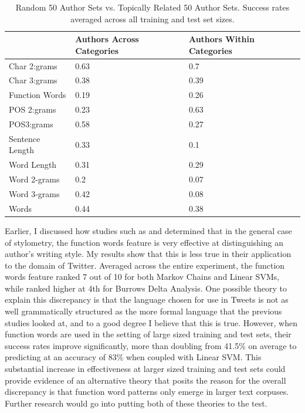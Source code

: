 \documentclass[pageno]{jpaper}
\begin{document}
\begin{table}[h!]
\centering
\begin{tabular}{|l|l|l|}
\hline
                & Authors Across Categories & Authors Within Categories \\ \hline
Char 2:grams    & 0.63                      & 0.7                       \\ \hline
Char 3:grams    & 0.38                      & 0.39                      \\ \hline
Function Words  & 0.19                      & 0.26                      \\ \hline
POS 2:grams     & 0.23                      & 0.63                      \\ \hline
POS3:grams      & 0.58                      & 0.27                      \\ \hline
Sentence Length & 0.33                      & 0.1                       \\ \hline
Word Length     & 0.31                      & 0.29                      \\ \hline
Word 2-grams    & 0.2                       & 0.07                      \\ \hline
Word 3-grams    & 0.42                      & 0.08                      \\ \hline
Words           & 0.44                      & 0.38                      \\ \hline
\end{tabular}
\caption{Random 50 Author Sets vs. Topically Related 50 Author Sets.  Success rates averaged across all training and test set sizes.}
\label{table:randAuthorSets}
\end{table}

Earlier, I discussed how studies such as \cite{Argamon05measuringthe} and \cite{performance_of_features} determined that in the general case of stylometry, the function words feature is very effective at distinguishing an author's writing style.  My results show that this is less true in their application to the domain of Twitter.  Averaged across the entire experiment, the function words feature ranked 7 out of 10 for both Markov Chains and Linear SVMs, while ranked higher at 4th for Burrows Delta Analysis.  One possible theory to explain this discrepancy is that the language chosen for use in Tweets is not as well grammatically structured as the more formal language that the previous studies looked at, and to a good degree I believe that this is true. However, when function words are used in the setting of large sized training and test sets, their success rates improve significantly, more than doubling from 41.5\% on average to predicting at an accuracy of 83\% when coupled with Linear SVM.  This substantial increase in effectiveness at larger sized training and test sets could provide evidence of an alternative theory that posits the reason for the overall discrepancy is that function word patterns only emerge in larger text corpuses.  Further research would go into putting both of these theories to the test.
\end{document}
